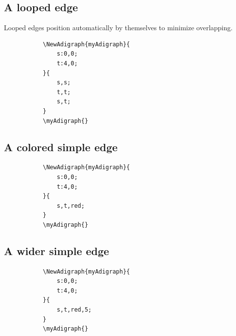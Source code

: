 \documentclass{report}
\begin{document}
\subsection{A looped edge}
Looped edges position automatically by themselves to minimize overlapping.
\begin{figure}
	\begin{subfigure}{0.49\textwidth}
		\begin{verbatim}
\NewAdigraph{myAdigraph}{
 	s:0,0;
 	t:4,0;
}{
	s,s;
	t,t;
	s,t;
}
\myAdigraph{}
\end{verbatim}
	\end{subfigure}
	\begin{subfigure}{0.49\textwidth}
		\myAdigraph{}
	\end{subfigure}
\end{figure}

\subsection{A colored simple edge}
\begin{figure}
	\begin{subfigure}{0.49\textwidth}
		\begin{verbatim}
\NewAdigraph{myAdigraph}{
 	s:0,0;
 	t:4,0;
}{
	s,t,red;
}
\myAdigraph{}
\end{verbatim}
	\end{subfigure}
	\begin{subfigure}{0.49\textwidth}
		\myAdigraph{}
	\end{subfigure}
\end{figure}

\subsection{A wider simple edge}
\begin{figure}
	\begin{subfigure}{0.49\textwidth}
		\begin{verbatim}
\NewAdigraph{myAdigraph}{
 	s:0,0;
 	t:4,0;
}{
	s,t,red,5;
}
\myAdigraph{}
\end{verbatim}
	\end{subfigure}
	\begin{subfigure}{0.49\textwidth}
		\myAdigraph{}
	\end{subfigure}
\end{figure}
\end{document}
